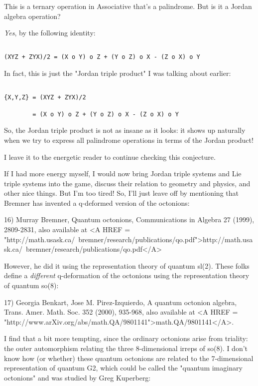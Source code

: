 This is a ternary operation in Associative that's a palindrome.
But is it a Jordan algebra operation?  

\emph{Yes}, by the following identity:


\begin{verbatim}

(XYZ + ZYX)/2 = (X o Y) o Z + (Y o Z) o X - (Z o X) o Y    
\end{verbatim}
    
In fact, this is just the "Jordan triple product" I was
talking about earlier:


\begin{verbatim}

{X,Y,Z} = (XYZ + ZYX)/2 

        = (X o Y) o Z + (Y o Z) o X - (Z o X) o Y    
\end{verbatim}
    
So, the Jordan triple product is not as insane as it looks: it 
shows up naturally when we try to express all palindrome operations 
in terms of the Jordan product!

I leave it to the energetic reader to continue checking this conjecture.

If I had more energy myself, I would now bring Jordan triple systems and
Lie triple systems into the game, discuss their relation to geometry and
physics, and other nice things.  But I'm too tired!  So, I'll just leave
off by mentioning that Bremner has invented a q-deformed version of the
octonions:

16) Murray Bremner, Quantum octonions, Communications in Algebra 
27 (1999), 2809-2831, also available at 
<A HREF = "http://math.usask.ca/~bremner/research/publications/qo.pdf">http://math.usask.ca/~bremner/research/publications/qo.pdf</A>

However, he did it using the representation theory of quantum sl(2).
These folks define a \emph{different} q-deformation of the octonions using
the representation theory of quantum so(8):

17) Georgia Benkart, Jose M. Pirez-Izquierdo, A quantum octonion 
algebra, Trans. Amer. Math. Soc. 352 (2000), 935-968, also available at 
<A HREF = "http://www.arXiv.org/abs/math.QA/9801141">math.QA/9801141</A>.

I find that a bit more tempting, since the ordinary octonions arise from
triality: the outer automorphism relating the three 8-dimensional irreps
of so(8).  I don't know how (or whether) these quantum octonions are
related to the 7-dimensional representation of quantum G2, which could
be called the "quantum imaginary octonions" and was studied by Greg
Kuperberg:


